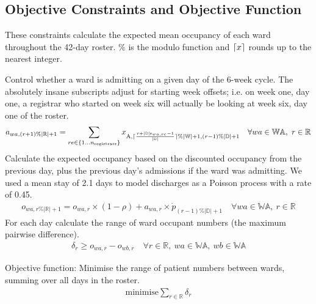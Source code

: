 \documentclass[a4paper]{article}
\DeclarePairedDelimiter{\ceil}{\lceil}{\rceil}
\begin{document}
\subsection{Objective Constraints and Objective Function}

These constraints calculate the expected mean occupancy of each ward throughout the 42-day roster. $\%$ is the modulo function and $\ceil{x}$ rounds up to the nearest integer.

Control whether a ward is admitting on a given day of the 6-week cycle. The absolutely insane subscripts adjust for starting week offsets; i.e. on week one, day one, a registrar who started on week six will actually be looking at week six, day one of the roster.
\begin{align}
  a_{wa, (r+1)\%|\mathbb{R}|+1} = \sum_{re\in \{1\dots n_\text{registrars}\}}{x_{\text{A}, \ceil{\frac{r+|\mathbb{D}|\text{s}_{wa, re}-1}{|\mathbb{D}|}} \% |\mathbb{W}|+1, (r-1) \% |\mathbb{D}|+1}} \quad\forall wa \in \mathbb{WA},\ r \in \mathbb{R}
\end{align}
Calculate the expected occupancy based on the discounted occupancy from the previous day, plus the previous day's admissions if the ward was admitting. We used a mean stay of 2.1 days to model discharges as a Poisson process with a rate of 0.45.
\begin{align}
  o_{wa, r\%|\mathbb{R}|+1} = o_{wa, r} \times (1-\rho) + a_{wa, r} \times \dot{p}_{(r-1)\%|\mathbb{D}|+1} \quad\forall wa \in \mathbb{WA},\ r \in \mathbb{R}
\end{align}
For each day calculate the range of ward occupant numbers (the maximum pairwise difference).
\begin{align}
  \delta_r \ge o_{wa, r} - o_{wb, r} \quad\forall r \in \mathbb{R},\ wa \in \mathbb{WA},\ wb \in \mathbb{WA}
\end{align}

\begin{framed}
Objective function: Minimise the range of patient numbers between wards, summing over all days in the roster.
\begin{align}
  \text{minimise} \sum_{r\in \mathbb{R}}{\delta_r}
\end{align}
\end{framed}
\end{document}
